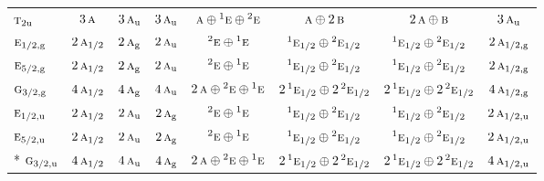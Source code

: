 \documentclass[10pt,a4paper]{article}
\numberwithin{equation}{section}
\newcommand{\irr}[1]{\text{\normalfont\scshape #1}}
\newcommand{\conjpair}[1]{{}^{#1}}
\newcommand{\ptag}[1]{\mathrm{#1}}
\begin{document}
{\begin{longtable}{@{}lccccccc@{}}
$\irr{t}_{2\ptag{u}}$ & $3\,\irr{a}$ & $3\,\irr{a}_{\ptag{u}}$ & $3\,\irr{a}_{\ptag{u}}$ & $\irr{a}\oplus \conjpair{1}\irr{e}\oplus \conjpair{2}\irr{e}$ & $\irr{a}\oplus 2\,\irr{b}$ & $2\,\irr{a}\oplus \irr{b}$ & $3\,\irr{a}_{\ptag{u}}$\\
$\irr{e}_{1/2,\ptag{g}}$ & $2\,\irr{a}_{1/2}$ & $2\,\irr{a}_{\ptag{g}}$ & $2\,\irr{a}_{\ptag{u}}$ & $\conjpair{2}\irr{e}\oplus \conjpair{1}\irr{e}$ & $\conjpair{1}\irr{e}_{1/2}\oplus \conjpair{2}\irr{e}_{1/2}$ & $\conjpair{1}\irr{e}_{1/2}\oplus \conjpair{2}\irr{e}_{1/2}$ & $2\,\irr{a}_{1/2,\ptag{g}}$\\
$\irr{e}_{5/2,\ptag{g}}$ & $2\,\irr{a}_{1/2}$ & $2\,\irr{a}_{\ptag{g}}$ & $2\,\irr{a}_{\ptag{u}}$ & $\conjpair{2}\irr{e}\oplus \conjpair{1}\irr{e}$ & $\conjpair{1}\irr{e}_{1/2}\oplus \conjpair{2}\irr{e}_{1/2}$ & $\conjpair{1}\irr{e}_{1/2}\oplus \conjpair{2}\irr{e}_{1/2}$ & $2\,\irr{a}_{1/2,\ptag{g}}$\\
$\irr{g}_{3/2,\ptag{g}}$ & $4\,\irr{a}_{1/2}$ & $4\,\irr{a}_{\ptag{g}}$ & $4\,\irr{a}_{\ptag{u}}$ & $2\,\irr{a}\oplus \conjpair{2}\irr{e}\oplus \conjpair{1}\irr{e}$ & $2\,\conjpair{1}\irr{e}_{1/2}\oplus 2\,\conjpair{2}\irr{e}_{1/2}$ & $2\,\conjpair{1}\irr{e}_{1/2}\oplus 2\,\conjpair{2}\irr{e}_{1/2}$ & $4\,\irr{a}_{1/2,\ptag{g}}$\\
$\irr{e}_{1/2,\ptag{u}}$ & $2\,\irr{a}_{1/2}$ & $2\,\irr{a}_{\ptag{u}}$ & $2\,\irr{a}_{\ptag{g}}$ & $\conjpair{2}\irr{e}\oplus \conjpair{1}\irr{e}$ & $\conjpair{1}\irr{e}_{1/2}\oplus \conjpair{2}\irr{e}_{1/2}$ & $\conjpair{1}\irr{e}_{1/2}\oplus \conjpair{2}\irr{e}_{1/2}$ & $2\,\irr{a}_{1/2,\ptag{u}}$\\
$\irr{e}_{5/2,\ptag{u}}$ & $2\,\irr{a}_{1/2}$ & $2\,\irr{a}_{\ptag{u}}$ & $2\,\irr{a}_{\ptag{g}}$ & $\conjpair{2}\irr{e}\oplus \conjpair{1}\irr{e}$ & $\conjpair{1}\irr{e}_{1/2}\oplus \conjpair{2}\irr{e}_{1/2}$ & $\conjpair{1}\irr{e}_{1/2}\oplus \conjpair{2}\irr{e}_{1/2}$ & $2\,\irr{a}_{1/2,\ptag{u}}$\\*
$\irr{g}_{3/2,\ptag{u}}$ & $4\,\irr{a}_{1/2}$ & $4\,\irr{a}_{\ptag{u}}$ & $4\,\irr{a}_{\ptag{g}}$ & $2\,\irr{a}\oplus \conjpair{2}\irr{e}\oplus \conjpair{1}\irr{e}$ & $2\,\conjpair{1}\irr{e}_{1/2}\oplus 2\,\conjpair{2}\irr{e}_{1/2}$ & $2\,\conjpair{1}\irr{e}_{1/2}\oplus 2\,\conjpair{2}\irr{e}_{1/2}$ & $4\,\irr{a}_{1/2,\ptag{u}}$\\
\bottomrule\end{longtable}}
\end{document}
